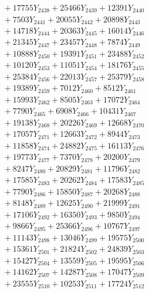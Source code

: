 \documentclass[a4paper,10pt]{article}
\begin{document}
{\begin{align}
&\;  + 17755 Y_{2438} + 25466 Y_{2439} + 12391 Y_{2440} \\[0.3ex]
&\;  + 7503 Y_{2441} + 20055 Y_{2442} + 20898 Y_{2443} \\[0.3ex]
&\;  + 14718 Y_{2444} + 20363 Y_{2445} + 16014 Y_{2446} \\[0.3ex]
&\;  + 21345 Y_{2447} + 23457 Y_{2448} + 7874 Y_{2449} \\[0.3ex]
&\;  + 10888 Y_{2450} + 19391 Y_{2451} + 23488 Y_{2452} \\[0.3ex]
&\;  + 10120 Y_{2453} + 11051 Y_{2454} + 18176 Y_{2455} \\[0.3ex]
&\;  + 25384 Y_{2456} + 22013 Y_{2457} + 25379 Y_{2458} \\[0.5ex]\allowbreak
&\;  + 19389 Y_{2459} + 7012 Y_{2460} + 8512 Y_{2461} \\[0.3ex]
&\;  + 15993 Y_{2462} + 8505 Y_{2463} + 17072 Y_{2464} \\[0.3ex]
&\;  + 7790 Y_{2465} + 6908 Y_{2466} + 10431 Y_{2467} \\[0.3ex]
&\;  + 19138 Y_{2468} + 20226 Y_{2469} + 12668 Y_{2470} \\[0.3ex]
&\;  + 17057 Y_{2471} + 12663 Y_{2472} + 8944 Y_{2473} \\[0.3ex]
&\;  + 11858 Y_{2474} + 24882 Y_{2475} + 16113 Y_{2476} \\[0.3ex]
&\;  + 19773 Y_{2477} + 7370 Y_{2478} + 20200 Y_{2479} \\[0.3ex]
&\;  + 8247 Y_{2480} + 20829 Y_{2481} + 11796 Y_{2482} \\[0.3ex]
&\;  + 17585 Y_{2483} + 20262 Y_{2484} + 17583 Y_{2485} \\[0.3ex]
&\;  + 7790 Y_{2486} + 15850 Y_{2487} + 20268 Y_{2488} \\[0.5ex]\allowbreak
&\;  + 8148 Y_{2489} + 12625 Y_{2490} + 21999 Y_{2491} \\[0.3ex]
&\;  + 17106 Y_{2492} + 16350 Y_{2493} + 9850 Y_{2494} \\[0.3ex]
&\;  + 9866 Y_{2495} + 25366 Y_{2496} + 10767 Y_{2497} \\[0.3ex]
&\;  + 11143 Y_{2498} + 13046 Y_{2499} + 19575 Y_{2500} \\[0.3ex]
&\;  + 15361 Y_{2501} + 21824 Y_{2502} + 24839 Y_{2503} \\[0.3ex]
&\;  + 15427 Y_{2504} + 13559 Y_{2505} + 19595 Y_{2506} \\[0.3ex]
&\;  + 14162 Y_{2507} + 14287 Y_{2508} + 17047 Y_{2509} \\[0.3ex]
&\;  + 23555 Y_{2510} + 10253 Y_{2511} + 17724 Y_{2512} \\[0.3ex]

\end{align}}
\end{document}
